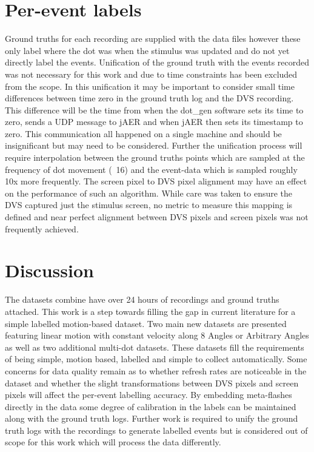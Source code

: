 \section{Per-event labels}
Ground truths for each recording are supplied with the data files however these only label where the dot was when the stimulus was updated and do not yet directly label the events.
Unification of the ground truth with the events recorded was not necessary for this work and due to time constraints has been excluded from the scope.
In this unification it may be important to consider small time differences between time zero in the ground truth log and the DVS recording.
This difference will be the time from when the dot\_gen software sets its time to zero, sends a UDP message to jAER and when jAER then sets its timestamp to zero. 
This communication all happened on a single machine and should be insignificant but may need to be considered. 
Further the unification process will require interpolation between the ground truths points which are sampled at the frequency of dot movement (~16\ms) and the event-data which is sampled roughly 10x more frequently.
The screen pixel to DVS pixel alignment may have an effect on the performance of such an algorithm. 
While care was taken to ensure the DVS captured just the stimulus screen, no metric to measure this mapping is defined and near perfect alignment between DVS pixels and screen pixels was not frequently achieved. 




\section{Discussion}
The datasets combine have over 24 hours of recordings and ground truths attached.
This work is a step towards filling the gap in current literature for a simple labelled motion-based dataset. 
Two main new datasets are presented featuring linear motion with constant velocity along 8 Angles or Arbitrary Angles as well as two additional multi-dot datasets.
These datasets fill the requirements of being simple, motion based, labelled and simple to collect automatically.
Some concerns for data quality remain as to whether refresh rates are noticeable in the dataset and whether the slight transformations between DVS pixels and screen pixels will affect the per-event labelling accuracy.
By embedding meta-flashes directly in the data some degree of calibration in the labels can be maintained along with the ground truth logs. 
Further work is required to unify the ground truth logs with the recordings to generate labelled events but is considered out of scope for this work which will process the data differently. 

